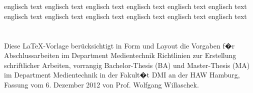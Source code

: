 


\usepackage[latin1]{inputenc} %







\newcommand{\vorname}{Matthias}
\newcommand{\nachname}{Held}
\newcommand{\matrikelnummer}{2182712}

\newcommand{\titel}{Red Tail\\[0.2ex] 
				\Large Untertitel Untertitel Untertitel Untertitel}

\newcommand{\erstpruef}{Prof. Dr. Roland Greule}
\newcommand{\zweitpruef}{Matthias Allhoff}

\date{\sffamily Hamburg, 2. 2. 2020}  %




\maketitle           %
\tableofcontents %
\clearpage          %



\thispagestyle{empty}
\section*{\centering\abstractname}
\label{sec:Abstract}
englisch text englisch text englisch text englisch text
englisch text englisch text englisch text englisch text
englisch text englisch text englisch text englisch text


\section*{\centering\abstractname}
\label{sec:Zusammenfassung}
Diese \LaTeX-Vorlage berücksichtigt in Form und Layout die Vorgaben f�r Abschlussarbeiten im Department Medientechnik \glqq Richtlinien zur Erstellung schriftlicher Arbeiten, vorrangig Bachelor-Thesis (BA) und Master-Thesis (MA) im Department Medientechnik in der Fakult�t DMI an der HAW Hamburg\grqq, Fassung vom 6. Dezember 2012 von Prof. Wolfgang Willaschek.
 
